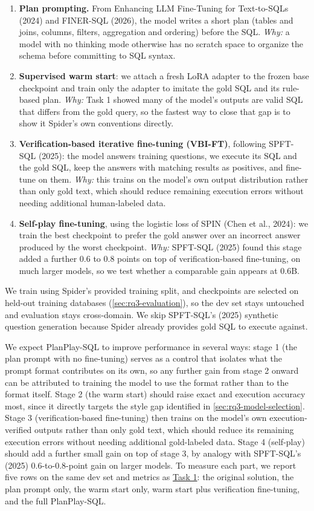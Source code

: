 \begin{enumerate}
\item \textbf{Plan prompting.} From Enhancing LLM Fine-Tuning for Text-to-SQLs (2024) and FINER-SQL (2026), the model writes a short plan (tables and joins, columns, filters, aggregation and ordering) before the SQL. \emph{Why:} a model with no thinking mode otherwise has no scratch space to organize the schema before committing to SQL syntax.
\item \textbf{Supervised warm start}: we attach a fresh LoRA adapter to the frozen base checkpoint and train only the adapter to imitate the gold SQL and its rule-based plan. \emph{Why:} Task 1 showed many of the model's outputs are valid SQL that differs from the gold query, so the fastest way to close that gap is to show it Spider's own conventions directly.
\item \textbf{Verification-based iterative fine-tuning (VBI-FT)}, following SPFT-SQL (2025): the model answers training questions, we execute its SQL and the gold SQL, keep the answers with matching results as positives, and fine-tune on them. \emph{Why:} this trains on the model's own output distribution rather than only gold text, which should reduce remaining execution errors without needing additional human-labeled data.
\item \textbf{Self-play fine-tuning}, using the logistic loss of SPIN (Chen et al., 2024): we train the best checkpoint to prefer the gold answer over an incorrect answer produced by the worst checkpoint. \emph{Why:} SPFT-SQL (2025) found this stage added a further 0.6 to 0.8 points on top of verification-based fine-tuning, on much larger models, so we test whether a comparable gain appears at 0.6B.
\end{enumerate}

We train using Spider's provided training split, and checkpoints are selected on held-out training databases (\ref{sec:rq3-evaluation}), so the dev set stays untouched and evaluation stays cross-domain. We skip SPFT-SQL's (2025) synthetic question generation because Spider already provides gold SQL to execute against.

We expect PlanPlay-SQL to improve performance in several ways: stage 1 (the plan prompt with no fine-tuning) serves as a control that isolates what the prompt format contributes on its own, so any further gain from stage 2 onward can be attributed to training the model to use the format rather than to the format itself. Stage 2 (the warm start) should raise exact and execution accuracy most, since it directly targets the style gap identified in \ref{sec:rq3-model-selection}. Stage 3 (verification-based fine-tuning) then trains on the model's own execution-verified outputs rather than only gold text, which should reduce its remaining execution errors without needing additional gold-labeled data. Stage 4 (self-play) should add a further small gain on top of stage 3, by analogy with SPFT-SQL's (2025) 0.6-to-0.8-point gain on larger models. To measure each part, we report five rows on the same dev set and metrics as \hyperref[sec:rq1-results]{Task 1}: the original solution, the plan prompt only, the warm start only, warm start plus verification fine-tuning, and the full PlanPlay-SQL.



